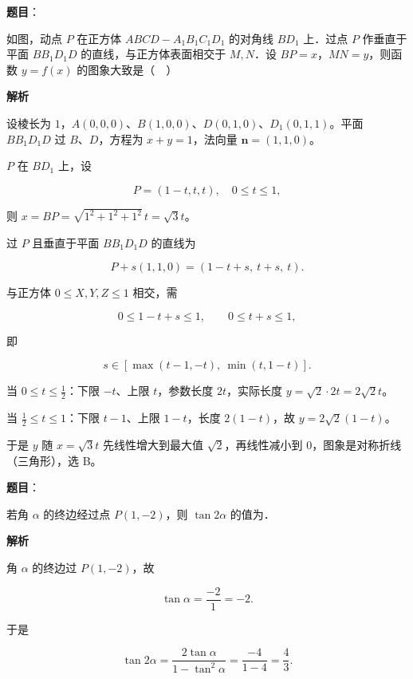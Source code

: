 \begin{answer}

\textbf{题目}：

如图，动点 $P$ 在正方体 $ABCD-A_1B_1C_1D_1$ 的对角线 $BD_1$ 上．过点 $P$ 作垂直于平面 $BB_1D_1D$ 的直线，与正方体表面相交于 $M,N$．设 $BP=x$，$MN=y$，则函数 $y=f(x)$ 的图象大致是（　）
\nopagebreak[4]
\begin{center}\end{center}
\nopagebreak[4]
\textbf{解析}

设棱长为 $1$，$A(0,0,0)$、$B(1,0,0)$、$D(0,1,0)$、$D_1(0,1,1)$。平面 $BB_1D_1D$ 过 $B$、$D$，方程为 $x+y=1$，法向量 $\boldsymbol n=(1,1,0)$。

$P$ 在 $BD_1$ 上，设

\nopagebreak[4]
\[P=(1-t,t,t),\quad 0\leqslant t\leqslant1,\]

则 $x=BP=\sqrt{1^2+1^2+1^2}\,t=\sqrt3t$。

过 $P$ 且垂直于平面 $BB_1D_1D$ 的直线为

\nopagebreak[4]
\[P+s(1,1,0)=(1-t+s,\ t+s,\ t).\]

与正方体 $0\leqslant X,Y,Z\leqslant1$ 相交，需

\nopagebreak[4]
\[0\leqslant1-t+s\leqslant1,\qquad 0\leqslant t+s\leqslant1,\]

即

\nopagebreak[4]
\[s\in[\max(t-1,-t),\ \min(t,1-t)].\]

当 $0\leqslant t\leqslant\frac12$：下限 $-t$、上限 $t$，参数长度 $2t$，实际长度 $y=\sqrt2\cdot2t=2\sqrt2t$。

当 $\frac12\leqslant t\leqslant1$：下限 $t-1$、上限 $1-t$，长度 $2(1-t)$，故 $y=2\sqrt2(1-t)$。

于是 $y$ 随 $x=\sqrt3t$ 先线性增大到最大值 $\sqrt2$，再线性减小到 $0$，图象是对称折线（三角形），选 B。


\end{answer}
\begin{answer}

\textbf{题目}：

若角 $\alpha$ 的终边经过点 $P(1,-2)$，则 $\tan2\alpha$ 的值为\gkblank{}．

\textbf{解析}

角 $\alpha$ 的终边过 $P(1,-2)$，故

\nopagebreak[4]
\[\tan\alpha=\frac{-2}{1}=-2 .\]

于是

\nopagebreak[4]
\[\tan2\alpha=\frac{2\tan\alpha}{1-\tan^2\alpha}=\frac{-4}{1-4}=\frac43 .\]


\end{answer}
